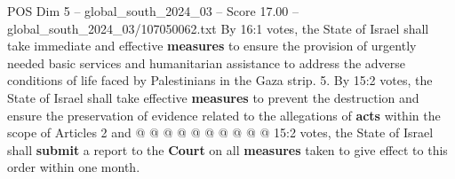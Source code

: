 \begin{textsample}{POS Dim 5 – global\_south\_2024\_03 – Score 17.00 – global\_south\_2024\_03/107050062.txt}
By 16:1 votes, the State of Israel shall take immediate and effective \textbf{measures} to ensure the provision of urgently needed basic services and humanitarian assistance to address the adverse conditions of life faced by Palestinians in the Gaza strip. 5.
By 15:2 votes, the State of Israel shall take effective \textbf{measures} to prevent the destruction and ensure the preservation of evidence related to the allegations of \textbf{acts} within the scope of Articles 2 and @ @ @ @ @ @ @ @ @ @ 15:2 votes, the State of Israel shall \textbf{submit} a report to the \textbf{Court} on all \textbf{measures} taken to give effect to this order within one month.

\end{textsample}
